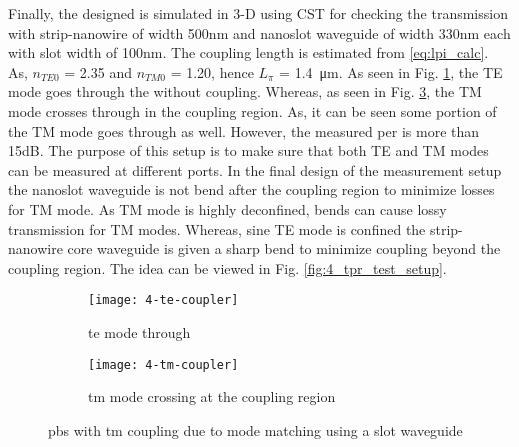 \documentclass[../report.tex]{subfiles}
\begin{document}
\noindent Finally, the designed is simulated in 3-D using CST for checking the transmission with strip-nanowire of width 500nm and nanoslot waveguide of width 330nm each with slot width of 100nm. The coupling length is estimated from \ref{eq:lpi_calc}. As, $n_{TE0}$ = 2.35 and $n_{TM0}$ = 1.20, hence $L_{\pi}$ = \SI{1.4}{\micro\meter}. As seen in Fig. \ref{fig:4_te_coupler}, the TE mode goes through the without coupling. Whereas, as seen in Fig. \ref{fig:4_tm_coupler}, the TM mode crosses through in the coupling region. As, it can be seen some portion of the TM mode goes through as well. However, the measured \gls{per} is more than 15dB. The purpose of this setup is to make sure that both TE and TM modes can be measured at different ports. In the final design of the measurement setup the nanoslot waveguide is not bend after the coupling region to minimize losses for TM mode. As TM mode is highly deconfined, bends can cause lossy transmission for TM modes. Whereas, sine TE mode is confined the strip-nanowire core waveguide is given a sharp bend to minimize coupling beyond the coupling region. The idea can be viewed in Fig. \ref{fig:4_tpr_test_setup}.

\begin{figure}[H] %
	\begin{subfigure}[t]{0.45\textwidth}
		\texttt{[image: 4-te-coupler]}
		\caption{\gls{te} mode through}
		\label{fig:4_te_coupler}
	\end{subfigure}
	\hfill
	\begin{subfigure}[t]{0.45\textwidth}
		\texttt{[image: 4-tm-coupler]}
		\caption{\gls{tm} mode crossing at the coupling region}
		\label{fig:4_tm_coupler}
	\end{subfigure}
	\caption{\gls{pbs} with \gls{tm} coupling due to mode matching using a slot waveguide}
\end{figure}
\end{document}
